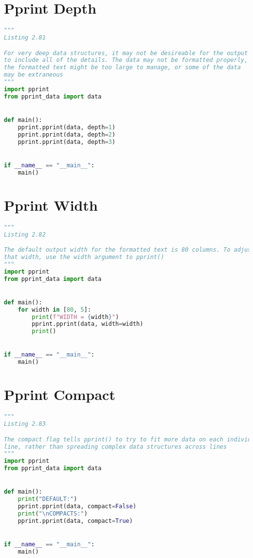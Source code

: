 \documentclass[a4paper,landscape]{report}
\begin{document}
\section{Pprint Depth}
\begin{lstlisting}[language=Python]
"""
Listing 2.81

For very deep data structures, it may not be desireable for the output
to include all of the details. The data may not be formatted properly,
the formatted text might be too large to manage, or some of the data
may be extraneous
"""
import pprint
from pprint_data import data


def main():
    pprint.pprint(data, depth=1)
    pprint.pprint(data, depth=2)
    pprint.pprint(data, depth=3)


if __name__ == "__main__":
    main()

\end{lstlisting}
\section{Pprint Width}
\begin{lstlisting}[language=Python]
"""
Listing 2.82

The default output width for the formatted text is 80 columns. To adjust
that width, use the width argument to pprint()
"""
import pprint
from pprint_data import data


def main():
    for width in [80, 5]:
        print(f"WIDTH = {width}")
        pprint.pprint(data, width=width)
        print()


if __name__ == "__main__":
    main()

\end{lstlisting}
\section{Pprint Compact}
\begin{lstlisting}[language=Python]
"""
Listing 2.83

The compact flag tells pprint() to try to fit more data on each individual
line, rather than spreading complex data structures across lines
"""
import pprint
from pprint_data import data


def main():
    print("DEFAULT:")
    pprint.pprint(data, compact=False)
    print("\nCOMPACTS:")
    pprint.pprint(data, compact=True)


if __name__ == "__main__":
    main()

\end{lstlisting}
\end{document}
